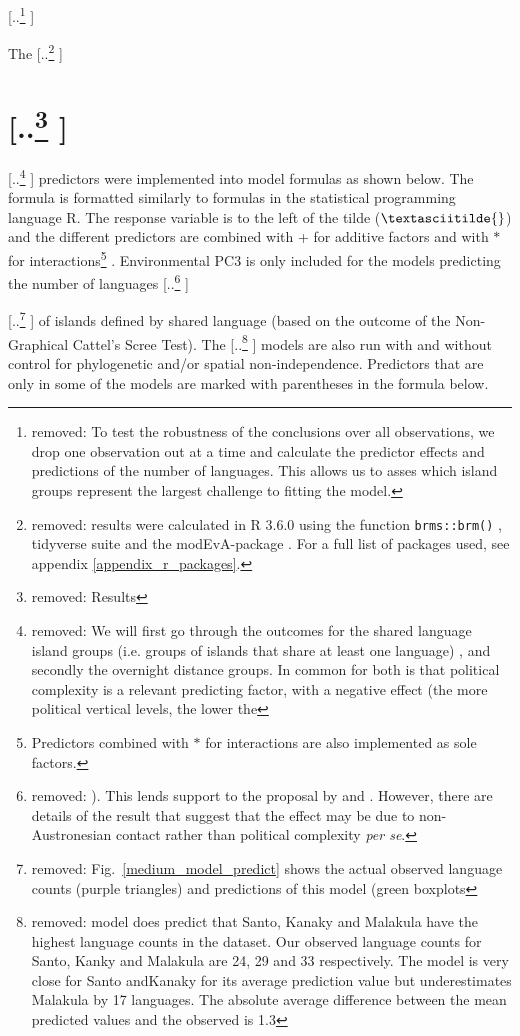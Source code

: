 \documentclass[unnumsec,webpdf,modern,medium]{oup-authoring-template}
\providecommand{\DIFaddtex}[1]{{\protect\color{blue} \sf #1}} %
\providecommand{\DIFdeltex}[1]{{\protect\color{red} [..\footnote{removed: #1} ]}} %
\providecommand{\DIFaddbegin}{} %
\providecommand{\DIFaddend}{} %
\providecommand{\DIFdelbegin}{} %
\providecommand{\DIFdelend}{} %
\providecommand{\DIFadd}[1]{\texorpdfstring{\DIFaddtex{#1}}{#1}} %
\providecommand{\DIFdel}[1]{\texorpdfstring{\DIFdeltex{#1}}{}} %
\newcommand{\DIFscaledelfig}{0.5}
\newlength{\DIFdelgraphicswidth} %
\newlength{\DIFdelgraphicsheight} %
\newcommand{\DIFaddincludegraphics}[2][]{{\color{blue}\fbox{\DIFOincludegraphics[#1]{#2}}}} %
\newcommand{\DIFdelincludegraphics}[2][]{%
\sbox{\DIFdelgraphicsbox}{\DIFOincludegraphics[#1]{#2}}%
\settoboxwidth{\DIFdelgraphicswidth}{\DIFdelgraphicsbox} %
\settoboxtotalheight{\DIFdelgraphicsheight}{\DIFdelgraphicsbox} %
\scalebox{\DIFscaledelfig}{%
\parbox[b]{\DIFdelgraphicswidth}{\usebox{\DIFdelgraphicsbox}\\[-\baselineskip] \rule{\DIFdelgraphicswidth}{0em}}\llap{\resizebox{\DIFdelgraphicswidth}{\DIFdelgraphicsheight}{%
\setlength{\unitlength}{\DIFdelgraphicswidth}%
\begin{picture}(1,1)%
\thicklines\linethickness{2pt} %
{\color[rgb]{1,0,0}\put(0,0){\framebox(1,1){}}}%
{\color[rgb]{1,0,0}\put(0,0){\line( 1,1){1}}}%
{\color[rgb]{1,0,0}\put(0,1){\line(1,-1){1}}}%
\end{picture}%
}\hspace*{3pt}}} %
} %
\DeclareRobustCommand{\DIFaddbegin}{\DIFOaddbegin \let\includegraphics\DIFaddincludegraphics} %
\DeclareRobustCommand{\DIFaddend}{\DIFOaddend \let\includegraphics\DIFOincludegraphics} %
\DeclareRobustCommand{\DIFdelbegin}{\DIFOdelbegin \let\includegraphics\DIFdelincludegraphics} %
\DeclareRobustCommand{\DIFdelend}{\DIFOaddend \let\includegraphics\DIFOincludegraphics} %
\begin{document}
\DIFdelbegin \DIFdel{To test the robustness of the conclusions over all observations, we drop one observation out at a time and calculate the predictor effects and predictions of the number of languages. This allows us to asses which island groups represent the largest challenge to fitting the model. 
}%

\DIFdelend The \DIFdelbegin \DIFdel{results were calculated in R 3.6.0 \citep{R} using the function \texttt{brms::brm()} \citep{burkner2017brms}, tidyverse suite \citep{tidyverse13} and the modEvA-package \citep{barbosa2016package}. For a full list of packages used, see appendix \ref{appendix_r_packages}.
}%

\section{\DIFdel{Results}}
\addtocounter{section}{-1}%
\DIFdel{We will first go through the outcomes for the shared language island groups (i.e. groups of islands that share at least one language) , and secondly the overnight distance groups. In common for both is that political complexity is a relevant predicting factor, with a negative effect (the more political vertical levels, the lower the }\DIFdelend \DIFaddbegin \DIFadd{predictors were implemented into model formulas as shown below. The formula is formatted similarly to formulas in the statistical programming language R. The response variable is to the left of the tilde ($\textasciitilde{}$) and the different predictors are combined with + for additive factors and with $\ast$ for interactions}\footnote{\DIFadd{Predictors combined with $\ast$ for interactions are also implemented as sole factors.}}\DIFadd{. Environmental PC3 is only included for the models predicting the }\DIFaddend number of languages \DIFdelbegin \DIFdel{). This lends support to the proposal by \citet{pawley81} and \citet{pawley2007}. However, there are details of the result that suggest that the effect may be due to non-Austronesian contact rather than political complexity \emph{per se}.
}%

\DIFdel{Fig.~\ref{medium_model_predict} shows the actual observed language counts (purple triangles) and predictions of this model (green boxplots}\DIFdelend \DIFaddbegin \DIFadd{of islands defined by shared language (based on the outcome of the Non-Graphical Cattel's Scree Test}\DIFaddend ). The \DIFdelbegin \DIFdel{model does predict that Santo, Kanaky and Malakula have the highest language counts in the dataset. Our observed language counts for Santo, Kanky and Malakula are 24, 29 and 33 respectively. The model is very close for Santo andKanaky for its average prediction value but underestimates Malakula by 17 languages. The absolute average difference between the mean predicted values and the observed is 1.3}\DIFdelend \DIFaddbegin \DIFadd{models are also run with and without control for phylogenetic and/or spatial non-independence. Predictors that are only in some of the models are marked with parentheses in the formula below}\DIFaddend .
\end{document}

